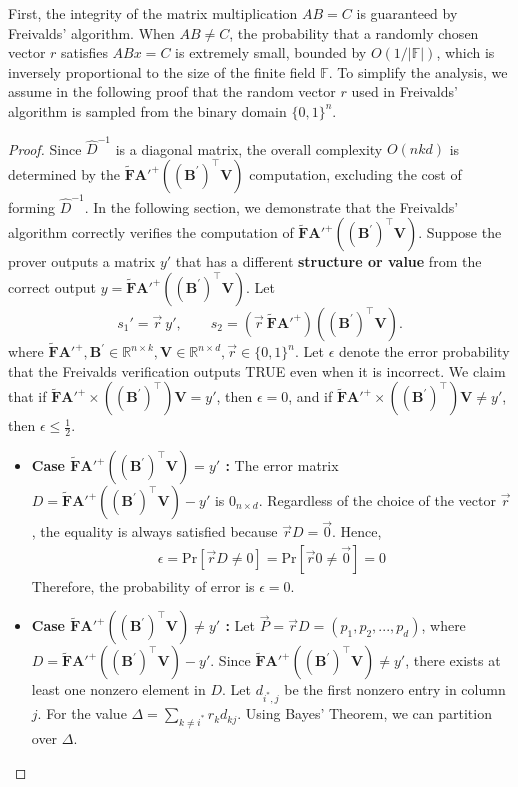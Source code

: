 \documentclass[letterpaper,twocolumn,10pt]{article}
\begin{document}
First, the integrity of the matrix multiplication $AB = C$ is guaranteed by Freivalds’ algorithm. When $AB \neq C$, the probability that a randomly chosen vector $r$ satisfies $ABx = C$ is extremely small, bounded by $O(1/|\mathbb{F}|)$, which is inversely proportional to the size of the finite field $\mathbb{F}$. To simplify the analysis, we assume in the following proof that the random vector $r$ used in Freivalds’ algorithm is sampled from the binary domain $\{0,1\}^n$.
\begin{proof}
Since $\hat{D}^{-1}$ is a diagonal matrix, the overall complexity $O(nkd)$ is determined by the $\mathbf{\tilde F{A'}^+}((\mathbf{B}^{'})^\top \mathbf{V})$ computation, excluding the cost of forming $\hat{D}^{-1}$. In the following section, we demonstrate that the Freivalds’ algorithm correctly verifies the computation of $\mathbf{\tilde F{A'}^+}((\mathbf{B}^{'})^\top \mathbf{V})$. Suppose the prover outputs a matrix $y'$ that has a different \textbf{structure or value} from the correct output $y=\mathbf{\tilde F{A'}^+}((\mathbf{B}^{'})^\top \mathbf{V})$.
Let
\[
  s_1' = \vec{r}\ y', \qquad
  s_2 = (\vec{r}\ \mathbf{\tilde F{A'}^+})((\mathbf{B}^{'})^\top \mathbf{V}).
\]
where $\mathbf{\tilde F{A'}^+},\mathbf{B}^{'} \in \mathbb{R}^{n\times k}, \mathbf{V} \in \mathbb{R}^{n\times d}, \vec{r} \in \{0,1\}^n$.
Let $\epsilon$ denote the error probability that the Freivalds verification outputs TRUE even when it is incorrect. We claim that if $\mathbf{\tilde F{A'}^+} \times ((\mathbf{B}^{'})^\top)\mathbf{V} = y'$, then $\epsilon = 0$, and if $\mathbf{\tilde F{A'}^+} \times ((\mathbf{B}^{'})^\top)\mathbf{V} \neq y'$, then $\epsilon \leq \frac{1}{2}$.
\begin{itemize}
    \item \textbf{Case $\mathbf{\tilde F{A'}^+}((\mathbf{B}^{'})^\top \mathbf{V})=y'$ :} The error matrix $D= \mathbf{\tilde F{A'}^+}((\mathbf{B}^{'})^\top \mathbf{V}) -y'$ is $0_{n\times d}$. Regardless of the choice of the vector $\vec{r}$, the equality is always satisfied because $\vec{r}D=\vec{0}$. Hence, 
    \[ \label{neqzero}
    \begin{split}
        \epsilon = \text{Pr}[\vec{r}D\neq 0] = \text{Pr}[\vec{r}0\neq \vec{0}] = 0
    \end{split}
    \]
    Therefore, the probability of error is $\epsilon=0$.
    \item \textbf{Case $\mathbf{\tilde F{A'}^+}((\mathbf{B}^{'})^\top \mathbf{V})\neq y'$ : } Let $\vec{P} = \vec{r}D= (p_1,p_2,...,p_d)$, where $D = \mathbf{\tilde F{A'}^+}((\mathbf{B}^{'})^\top \mathbf{V}) - y'.$ Since $\mathbf{\tilde F{A'}^+}((\mathbf{B}^{'})^\top \mathbf{V})\neq y'$, there exists at least one nonzero element in $D$. Let $d_{i^*,j}$ be the first nonzero entry in column $j$. For the value $\Delta=\sum_{k\neq i^*} r_kd_{kj}$. Using Bayes' Theorem, we can partition over $\Delta$.


\end{itemize}
\end{proof}
\end{document}
